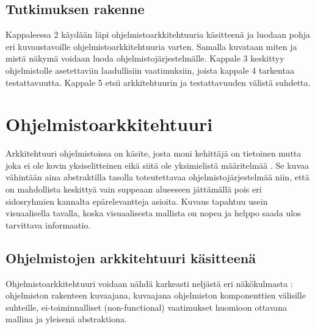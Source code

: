 \documentclass[finnish]{tktltiki2}
\theoremstyle{definition}
\theoremstyle{remark}
\begin{document}
\subsection{Tutkimuksen rakenne}

Kappaleessa 2 käydään läpi ohjelmistoarkkitehtuuria käsitteenä ja luodaan pohja eri kuvaustavoille ohjelmistoarkkitehtuuria varten. Samalla kuvataan miten ja mistä näkymä voidaan luoda ohjelmistojärjestelmälle. Kappale 3 keskittyy ohjelmistolle asetettaviin laadullisiin vaatimuksiin, joista kappale 4 tarkentaa testattavuutta. Kappale 5 etsii arkkitehtuurin ja testattavuuden välistä suhdetta.


\section{Ohjelmistoarkkitehtuuri}
Arkkitehtuuri ohjelmistoissa on käsite, josta moni kehittäjä on tietoinen mutta joka ei ole kovin yksiselitteinen eikä siitä ole yksimielistä määritelmää \citep[s. 363]{solms_what_2012}. 
Se kuvaa vähintään aina abstraktilla tasolla toteutettavaa ohjelmistojärjestelmää niin, että on mahdollista keskittyä vain suppeaan alueeseen jättämällä pois eri sidosryhmien kannalta epärelevantteja asioita. Kuvaus tapahtuu usein visuaalisella tavalla, koska visuaalisesta mallista on nopea ja helppo saada ulos tarvittava informaatio.   

\subsection{Ohjelmistojen arkkitehtuuri käsitteenä} \label{ark}
Ohjelmistoarkkitehtuuri voidaan nähdä karkeasti neljästä eri näkökulmasta  \citep[s. 2-7]{gorton_understanding_2011}:  ohjelmiston rakenteen kuvaajana, kuvaajana ohjelmiston komponenttien välisille suhteille, ei-toiminnalliset (non-functional) vaatimukset huomioon ottavana mallina ja yleisenä abstraktiona. 


\end{document}
